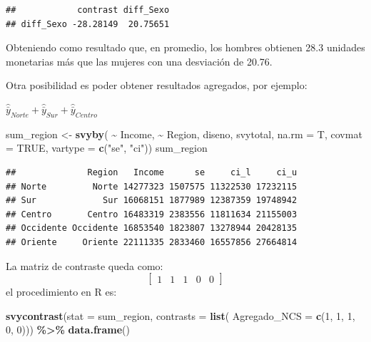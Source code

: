 \documentclass[
  12pt,
]{book}
\newenvironment{Shaded}{\begin{snugshade}}{\end{snugshade}}
\newcommand{\AttributeTok}[1]{\textcolor[rgb]{0.13,0.29,0.53}{#1}}
\newcommand{\ConstantTok}[1]{\textcolor[rgb]{0.56,0.35,0.01}{#1}}
\newcommand{\DecValTok}[1]{\textcolor[rgb]{0.00,0.00,0.81}{#1}}
\newcommand{\FunctionTok}[1]{\textcolor[rgb]{0.13,0.29,0.53}{\textbf{#1}}}
\newcommand{\NormalTok}[1]{#1}
\newcommand{\OtherTok}[1]{\textcolor[rgb]{0.56,0.35,0.01}{#1}}
\newcommand{\SpecialCharTok}[1]{\textcolor[rgb]{0.81,0.36,0.00}{\textbf{#1}}}
\newcommand{\StringTok}[1]{\textcolor[rgb]{0.31,0.60,0.02}{#1}}
\begin{document}
\begin{verbatim}
##            contrast diff_Sexo
## diff_Sexo -28.28149  20.75651
\end{verbatim}

Obteniendo como resultado que, en promedio, los hombres obtienen 28.3 unidades monetarias más que las mujeres con una desviación de 20.76.

Otra posibilidad es poder obtener resultados agregados, por ejemplo:

\(\hat{\bar{y}}_{Norte}+\hat{\bar{y}}_{Sur} +\hat{\bar{y}}_{Centro}\)

\begin{Shaded}
\begin{Highlighting}[]
\NormalTok{sum\_region }\OtherTok{\textless{}{-}} \FunctionTok{svyby}\NormalTok{( }\SpecialCharTok{\textasciitilde{}}\NormalTok{ Income,  }\SpecialCharTok{\textasciitilde{}}\NormalTok{ Region,}
\NormalTok{                     diseno, svytotal, }\AttributeTok{na.rm =}\NormalTok{ T,}
                     \AttributeTok{covmat =} \ConstantTok{TRUE}\NormalTok{,}
                     \AttributeTok{vartype =} \FunctionTok{c}\NormalTok{(}\StringTok{"se"}\NormalTok{, }\StringTok{"ci"}\NormalTok{))}
\NormalTok{sum\_region}
\end{Highlighting}
\end{Shaded}

\begin{verbatim}
##              Region   Income      se     ci_l     ci_u
## Norte         Norte 14277323 1507575 11322530 17232115
## Sur             Sur 16068151 1877989 12387359 19748942
## Centro       Centro 16483319 2383556 11811634 21155003
## Occidente Occidente 16853540 1823807 13278944 20428135
## Oriente     Oriente 22111335 2833460 16557856 27664814
\end{verbatim}

La matriz de contraste queda como:
\[
\left[\begin{array}{cccccc}
1 & 1 & 1 & 0 & 0
\end{array}\right]
\]
el procedimiento en R es:

\begin{Shaded}
\begin{Highlighting}[]
\FunctionTok{svycontrast}\NormalTok{(}\AttributeTok{stat =}\NormalTok{ sum\_region,}
            \AttributeTok{contrasts =} \FunctionTok{list}\NormalTok{(}
                             \AttributeTok{Agregado\_NCS =} \FunctionTok{c}\NormalTok{(}\DecValTok{1}\NormalTok{, }\DecValTok{1}\NormalTok{, }\DecValTok{1}\NormalTok{, }\DecValTok{0}\NormalTok{, }\DecValTok{0}\NormalTok{))) }\SpecialCharTok{\%\textgreater{}\%}                        \FunctionTok{data.frame}\NormalTok{()}
\end{Highlighting}
\end{Shaded}
\end{document}
